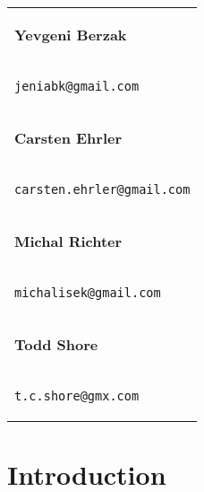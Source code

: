 \documentclass[paper=a4,draft=false]{scrartcl}
\begin{document}
\begin{titlepage}
  \begin{flushright}
    \begin{tabular}{l}
      \begin{large}\textbf{Yevgeni Berzak}\end{large} \\
      \begin{large}\texttt{jeniabk@gmail.com} \end{large}
      \vspace{.20in}\\
      \begin{large}\textbf{Carsten Ehrler}\end{large} \\
      \begin{large}\texttt{carsten.ehrler@gmail.com} \end{large}
      \vspace{.20in}\\
      \begin{large}\textbf{Michal Richter}\end{large} \\
      \begin{large}\texttt{michalisek@gmail.com} \end{large}
      \vspace{.20in}\\
      \begin{large}\textbf{Todd Shore}\end{large} \\
      \begin{large}\texttt{t.c.shore@gmx.com} \end{large}
    \end{tabular}
  \end{flushright}
\end{titlepage}

\newpage
\thispagestyle{empty}
\mbox{}
\newpage


\tableofcontents
\newpage

\begin{abstract}
\end{abstract}

\section{Introduction}\label{sec:introduction}

\end{document}
